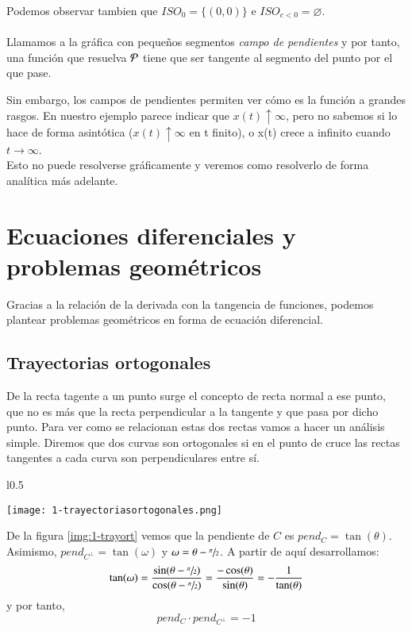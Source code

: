 \begin{eg}
\begin{minipage}[c]{0.65\textwidth}
        Podemos observar tambien que $ISO_0 = \{(0,0)\}$ e $ISO_{c < 0} = \varnothing$.\\\\ Llamamos a la gráfica con pequeños segmentos \textit{campo de pendientes} y por tanto, una función que resuelva $\P$ tiene que ser tangente al segmento del punto por el que pase.
    \end{minipage}
    Sin embargo, los campos de pendientes permiten ver cómo es la función a grandes rasgos. En nuestro ejemplo parece indicar que $x(t) \uparrow \infty$, pero no sabemos si lo hace de forma asintótica ($x(t) \uparrow \infty$ en t finito), o x(t) crece a infinito cuando $t \rightarrow \infty$.\\
    Esto no puede resolverse gráficamente y veremos como resolverlo de forma analítica más adelante.
\end{eg}

\section{Ecuaciones diferenciales y problemas geométricos}
Gracias a la relación de la derivada con la tangencia de funciones, podemos plantear problemas geométricos en forma de ecuación diferencial.
\subsection{Trayectorias ortogonales}
De la recta tagente a un punto surge el concepto de recta normal a ese punto, que no es más que la recta perpendicular a la tangente y que pasa por dicho punto. Para ver como se relacionan estas dos rectas vamos a hacer un análisis simple. Diremos que dos curvas son ortogonales si en el punto de cruce las rectas tangentes a cada curva son perpendiculares entre sí.
\begin{wrapfigure}[20]{l}{0.5\textwidth}
  \begin{center}
    \texttt{[image: 1-trayectoriasortogonales.png]}
  \end{center}
  \caption{Relaciones entre curvas ortogonales}\label{img:1-trayort}
\end{wrapfigure}
De la figura \ref{img:1-trayort} vemos que la pendiente de $C$ es $pend_C = \tan(\theta)$. Asimismo, $pend_{C^{\perp}} = \tan(\omega)$ y $\omega = \theta - \sfrac{\pi}{2}$. A partir de aquí desarrollamos:
$$
    \tan(\omega)=\frac{\sin(\theta-\sfrac{\pi}{2})}{\cos(\theta-\sfrac{\pi}{2})} = \frac{-\cos(\theta)}{\sin(\theta)} = -\frac{1}{\tan(\theta)}
$$
y por tanto,
\begin{equation} \label{eq:pendientes}
    pend_C \cdot pend_{C^{\perp}} = -1
\end{equation}

